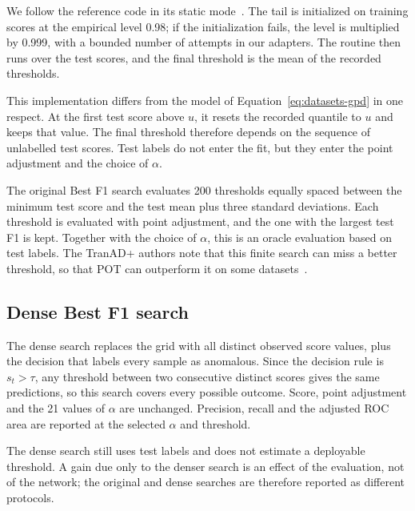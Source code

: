 We follow the reference code in its static mode~\cite{TranADPlusReferenceCode}.
The tail is initialized on training scores at the empirical level \num{0.98};
if the initialization fails, the level is multiplied by \num{0.999}, with a
bounded number of attempts in our adapters. The routine then runs over the
test scores, and the final threshold is the mean of the recorded thresholds.

This implementation differs from the model of
Equation~\eqref{eq:datasets-gpd} in one respect. At the first test score
above \(u\), it resets the recorded quantile to \(u\) and keeps that value.
The final threshold therefore depends on the sequence of unlabelled test
scores. Test labels do not enter the fit, but they enter the point
adjustment and the choice of \(\alpha\).

The original Best F1 search evaluates \num{200} thresholds equally spaced
between the minimum test score and the test mean plus three standard
deviations. Each threshold is evaluated with point adjustment, and the one
with the largest test F1 is kept. Together with the choice of \(\alpha\),
this is an oracle evaluation based on test labels. The TranAD+ authors note
that this finite search can miss a better threshold, so that \ac{POT} can
outperform it on some datasets~\cite{Yermakov2025TranADPlus}.

\subsection{Dense Best F1 search}
\label{sec:datasets-dense-thresholds}

The dense search replaces the grid with all distinct observed score values,
plus the decision that labels every sample as anomalous. Since the decision
rule is \(s_t>\tau\), any threshold between two consecutive distinct scores
gives the same predictions, so this search covers every possible outcome.
Score, point adjustment and the \num{21} values of \(\alpha\) are unchanged.
Precision, recall and the adjusted \ac{ROC} area are reported at the
selected \(\alpha\) and threshold.

The dense search still uses test labels and does not estimate a deployable
threshold. A gain due only to the denser search is an effect of the
evaluation, not of the network; the original and dense searches are
therefore reported as different protocols.

